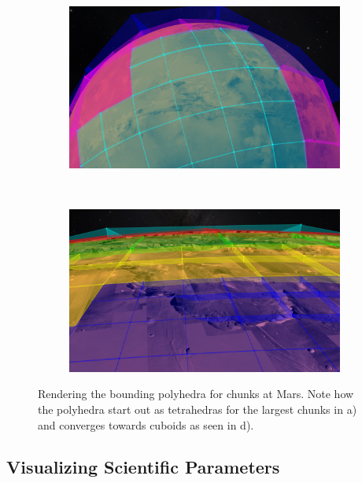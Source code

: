 \begin{figure}[h]
    \begin{subfigure}[bt]{0.45\textwidth}
        \includegraphics[width=\textwidth]{figures/results/screenshots_thesis_old/bounds3.jpg}
        \caption{}
    \end{subfigure}
    ~
    \begin{subfigure}[bt]{0.45\textwidth}
        \includegraphics[width=\textwidth]{figures/results/screenshots_thesis_old/bounds4.jpg}
        \caption{}
    \end{subfigure}
    \caption{Rendering the bounding polyhedra for chunks at Mars. Note how the polyhedra start out as tetrahedras for the largest chunks in a) and converges towards cuboids as seen in d). }
    \label{fig:boundingvolume}
\end{figure}

\clearpage
\subsection{Visualizing Scientific Parameters}
\FloatBarrier

